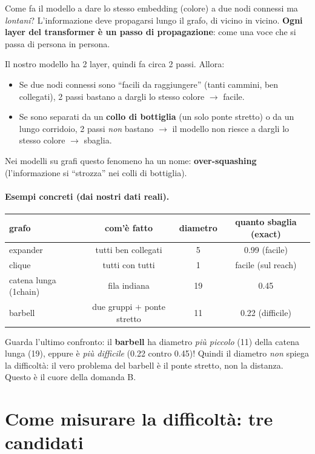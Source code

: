 \documentclass[11pt,a4paper]{article}
\begin{document}
Come fa il modello a dare lo stesso embedding (colore) a due nodi connessi ma
\emph{lontani}? L'informazione deve propagarsi lungo il grafo, di vicino in
vicino. \textbf{Ogni layer del transformer è un passo di propagazione}: come una
voce che si passa di persona in persona.

Il nostro modello ha 2 layer, quindi fa circa 2 passi. Allora:
\begin{itemize}
  \item Se due nodi connessi sono ``facili da raggiungere'' (tanti cammini, ben
        collegati), 2 passi bastano a dargli lo stesso colore $\rightarrow$ facile.
  \item Se sono separati da un \textbf{collo di bottiglia} (un solo ponte
        stretto) o da un lungo corridoio, 2 passi \emph{non} bastano $\rightarrow$
        il modello non riesce a dargli lo stesso colore $\rightarrow$ sbaglia.
\end{itemize}

Nei modelli su grafi questo fenomeno ha un nome: \textbf{over-squashing}
(l'informazione si ``strozza'' nei colli di bottiglia).

\paragraph{Esempi concreti (dai nostri dati reali).}
\begin{center}
\begin{tabular}{lccc}
\toprule
grafo & com'è fatto & diametro & quanto sbaglia (exact) \\
\midrule
expander  & tutti ben collegati          & 5  & 0.99 (facile) \\
clique    & tutti con tutti              & 1  & facile (sul reach) \\
catena lunga (1chain) & fila indiana     & 19 & 0.45 \\
barbell   & due gruppi $+$ ponte stretto & 11 & 0.22 (difficile) \\
\bottomrule
\end{tabular}
\end{center}

Guarda l'ultimo confronto: il \textbf{barbell} ha diametro \emph{più piccolo}
(11) della catena lunga (19), eppure è \emph{più difficile} (0.22 contro 0.45)!
Quindi il diametro \emph{non} spiega la difficoltà: il vero problema del barbell
è il ponte stretto, non la distanza. Questo è il cuore della domanda B.

\section{Come misurare la difficoltà: tre candidati}
\end{document}
